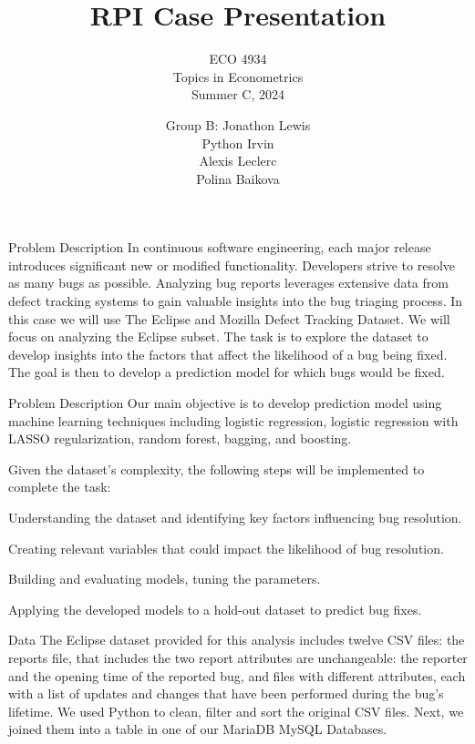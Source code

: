 \documentclass[10pt]{beamer}
\title{RPI Case Presentation}
\subtitle{ECO 4934 \\ Topics in Econometrics \\ Summer C, 2024}
\author{Group B: Jonathon Lewis \\ Python Irvin \\ Alexis Leclerc \\ Polina Baikova}
\begin{document}
	
\begin{frame}
\titlepage
\end{frame}
	
	
\begin{frame}[t]{Problem Description}\justifying \vspace{20pt}
	In continuous software engineering, each major release introduces significant new or modified functionality. Developers strive to resolve as many bugs as possible. Analyzing bug reports leverages extensive data from defect tracking systems to gain valuable insights into the bug triaging process.
	\vskip 16pt
	In this case we will use The Eclipse and Mozilla Defect Tracking Dataset. We will focus on analyzing the Eclipse subset. The task is to explore the dataset to develop insights into the factors that affect the likelihood of a bug being fixed. The goal is then to develop a prediction model for which bugs would be fixed.
	
\end{frame}


\begin{frame}[t]{Problem Description}\justifying \vspace{2pt}
	Our main objective is to develop prediction model using machine learning techniques including logistic regression, logistic regression with LASSO regularization, random forest, bagging, and boosting.  
	
	Given the dataset’s complexity, the following steps will be implemented to complete the task: 
	\begin{description}[font=$\bullet$~\normalfont\scshape\color{red!50!black}]
		\item [Exploratory Data Analysis:] Understanding the dataset and identifying key factors influencing bug resolution.
		\item [Feature Engineering:] Creating relevant variables that could impact the likelihood of bug resolution.
		\item [Model Development:] Building and evaluating models, tuning the parameters. 
		\item [Model Predictions:] Applying the developed models to a hold-out dataset to predict bug fixes.
		
	\end{description}
\end{frame}


\begin{frame}[t]{Data}\justifying \vspace{20pt}
	The Eclipse dataset provided for this analysis includes twelve CSV files: the reports file, that includes the two report attributes are unchangeable: the reporter and the opening time of the reported bug, and files with different attributes, each with a list of updates and changes that have been performed during the bug's lifetime.
	\vskip 16pt  
	We used Python to clean, filter and sort the original CSV files. Next, we joined them into a table in one of our MariaDB MySQL Databases.  
\end{frame}
\end{document}
